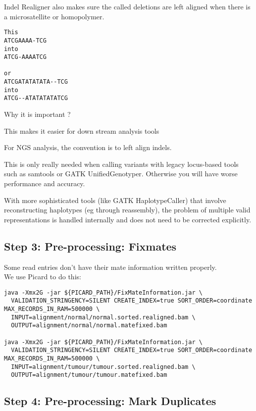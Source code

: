 Indel Realigner also makes sure the called deletions are left aligned when there is a microsatellite or homopolymer.

\begin{verbatim}
This
ATCGAAAA-TCG
into
ATCG-AAAATCG

or
ATCGATATATATA--TCG
into
ATCG--ATATATATATCG
\end{verbatim}


\begin{questions} 
Why it is important ? 
\end{questions}
\begin{answer}
This makes it easier for down stream analysis tools

For NGS analysis, the convention is to left align indels. 

This is only really needed when calling variants with legacy locus-based tools such as samtools or GATK UnifiedGenotyper. Otherwise you will have worse performance and accuracy.

With more sophisticated tools (like GATK HaplotypeCaller) that involve reconstructing haplotypes (eg through reassembly), the problem of multiple valid representations is handled internally and does not need to be corrected explicitly.
\end{answer}

\subsection{Step 3: Pre-processing: Fixmates}

Some read entries don't have their mate information written properly. \\
We use Picard to do this: 

\begin{lstlisting}
java -Xmx2G -jar ${PICARD_PATH}/FixMateInformation.jar \
  VALIDATION_STRINGENCY=SILENT CREATE_INDEX=true SORT_ORDER=coordinate MAX_RECORDS_IN_RAM=500000 \
  INPUT=alignment/normal/normal.sorted.realigned.bam \
  OUTPUT=alignment/normal/normal.matefixed.bam

java -Xmx2G -jar ${PICARD_PATH}/FixMateInformation.jar \
  VALIDATION_STRINGENCY=SILENT CREATE_INDEX=true SORT_ORDER=coordinate MAX_RECORDS_IN_RAM=500000 \
  INPUT=alignment/tumour/tumour.sorted.realigned.bam \
  OUTPUT=alignment/tumour/tumour.matefixed.bam
\end{lstlisting}

\subsection{Step 4: Pre-processing: Mark Duplicates}

